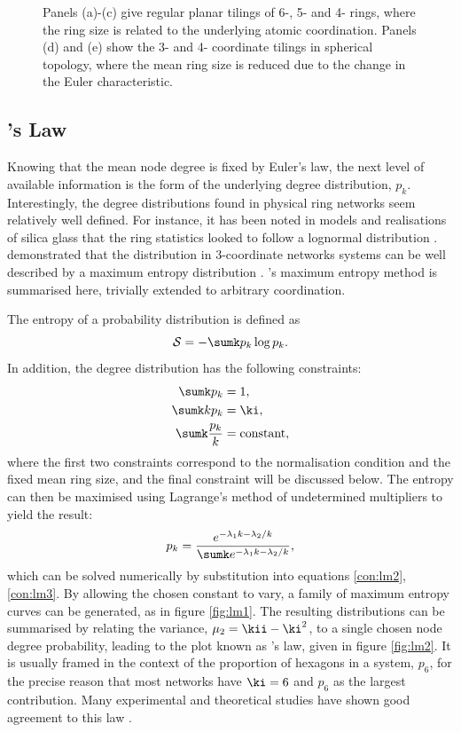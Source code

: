 \begin{figure}[bt]
     \caption{Panels (a)\--(c) give regular planar tilings of 6\--, 5\-- and 4\-- rings, where the ring size is related to the underlying atomic coordination. Panels (d) and (e) show the 3\-- and 4\-- coordinate tilings in spherical topology, where the mean ring size is reduced due to the change in the Euler characteristic.}
     \label{fig:lattices}
\end{figure}

\subsection{\lm's Law}
\label{s:lemaitre}

Knowing that the mean node degree is fixed by Euler's law, the next level of available information is the form of the underlying degree distribution, $p_k$.
Interestingly, the degree distributions found in physical ring networks seem relatively well defined.
For instance, it has been noted in models and realisations of \td{} silica glass that the ring statistics looked to follow a lognormal distribution \cite{Shackelford1981,Buchner2017}.
\lm{} \etal{} demonstrated that the distribution in 3-coordinate networks systems can be well described by a maximum entropy distribution \cite{Gervois1992}.
\lm's{} maximum entropy method is summarised here, trivially extended to arbitrary coordination.

The entropy of a probability distribution is defined as 
\begin{equation}
	\mathcal{S}=-\sumk p_k\log p_k. 
\end{equation}
In addition, the degree distribution has the following constraints:
\begin{align}
		\sumk p_k &=1, \\
		\sumk kp_k&=\ki,  \label{con:lm2}\\
		\sumk \frac{p_k}{k}&=\text{constant} \label{con:lm3},
\end{align}
where the first two constraints correspond to the normalisation condition and the fixed mean ring size, and the final constraint will be discussed below.
The entropy can then be maximised using Lagrange's method of undetermined multipliers to yield the result:
\begin{equation}
	\label{eq:mepk}
	p_k = \frac{e^{-\lambda_1 k - \lambda_2 / k}}{\sumk e^{-\lambda_1 k - \lambda_2 / k}},
\end{equation}
which can be solved numerically by substitution into equations \eqref{con:lm2},\eqref{con:lm3}. 
By allowing the chosen constant to vary, a family of maximum entropy curves can be generated, as in figure \ref{fig:lm1}.
The resulting distributions can be summarised by relating the variance, $\mu_2=\kii-\ki^2$, to a single chosen node degree probability, leading to the plot known as \lm's law, given in figure \ref{fig:lm2}.
It is usually framed in the context of the proportion of hexagons in a system, $p_6$, for the precise reason that most networks have $\ki=6$ and $p_6$ as the largest contribution.
Many experimental and theoretical studies have shown good agreement to this law \cite{Caer1993,Cerisier1996,Miklius2012}.

